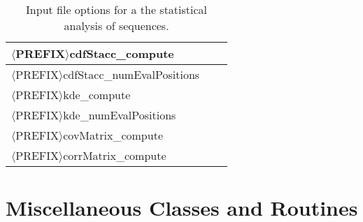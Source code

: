 \begin{table}[!h]
\begin{center}
\begin{tabular}{|l|c|c|}
\hline
\hline
$\langle$PREFIX$\rangle$cdfStacc\_compute          &         &             \\
\hline
$\langle$PREFIX$\rangle$cdfStacc\_numEvalPositions &         &             \\
\hline
\hline
$\langle$PREFIX$\rangle$kde\_compute               &         &             \\
\hline
$\langle$PREFIX$\rangle$kde\_numEvalPositions      &         &             \\
\hline
\hline
$\langle$PREFIX$\rangle$covMatrix\_compute         &         &             \\
\hline
$\langle$PREFIX$\rangle$corrMatrix\_compute        &         &             \\
\hline
\end{tabular}
\end{center}
\caption{
Input file options for a the statistical analysis of sequences.
}
\label{tab-seq-statistical-options}
\end{table}

\clearpage
\section{Miscellaneous Classes and Routines}

